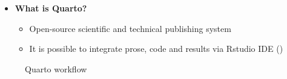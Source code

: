 \documentclass[
  ignorenonframetext,
]{beamer}
\providecommand{\tightlist}{%
  \setlength{\itemsep}{0pt}\setlength{\parskip}{0pt}}\usepackage{longtable,booktabs,array}
\begin{document}
\begin{frame}{}
\label{section-5}
\begin{itemize}
\item
  \textbf{What is Quarto?}

  \begin{itemize}
  \tightlist
  \item
    Open-source scientific and technical publishing system
  \item
    It is possible to integrate prose, code and results via Rstudio IDE
    ()
  \end{itemize}
\end{itemize}

\begin{figure}


\caption{\label{fig-quarto}Quarto workflow}

\end{figure}%
\end{frame}
\end{document}
